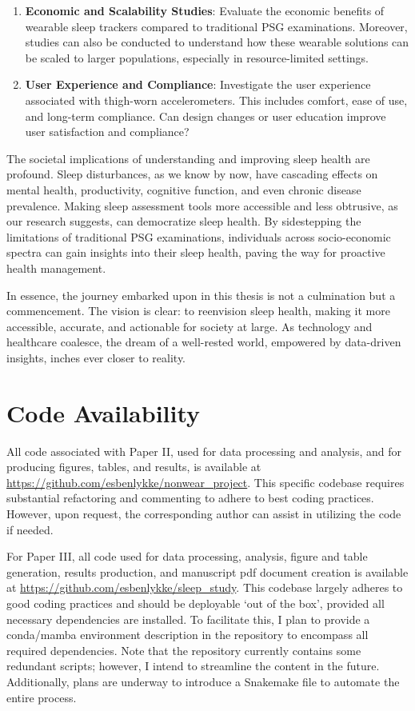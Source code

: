 \documentclass[
  10pt,
]{scrbook}
\let\originaltextbf\textbf
\renewcommand{\textbf}[1]{\textcolor{color1}{\textsf{\originaltextbf{#1}}}}
\begin{document}
\begin{enumerate}
\def\labelenumi{\arabic{enumi}.}
\item
  \textbf{Economic and Scalability Studies}: Evaluate the economic
  benefits of wearable sleep trackers compared to traditional PSG
  examinations. Moreover, studies can also be conducted to understand
  how these wearable solutions can be scaled to larger populations,
  especially in resource-limited settings.
\item
  \textbf{User Experience and Compliance}: Investigate the user
  experience associated with thigh-worn accelerometers. This includes
  comfort, ease of use, and long-term compliance. Can design changes or
  user education improve user satisfaction and compliance?
\end{enumerate}

The societal implications of understanding and improving sleep health
are profound. Sleep disturbances, as we know by now, have cascading
effects on mental health, productivity, cognitive function, and even
chronic disease prevalence. Making sleep assessment tools more
accessible and less obtrusive, as our research suggests, can democratize
sleep health. By sidestepping the limitations of traditional PSG
examinations, individuals across socio-economic spectra can gain
insights into their sleep health, paving the way for proactive health
management.

In essence, the journey embarked upon in this thesis is not a
culmination but a commencement. The vision is clear: to reenvision sleep
health, making it more accessible, accurate, and actionable for society
at large. As technology and healthcare coalesce, the dream of a
well-rested world, empowered by data-driven insights, inches ever closer
to reality.

\hypertarget{code-availability}{%
\chapter{Code Availability}\label{code-availability}}

All code associated with Paper II, used for data processing and
analysis, and for producing figures, tables, and results, is available
at \url{https://github.com/esbenlykke/nonwear_project}. This specific
codebase requires substantial refactoring and commenting to adhere to
best coding practices. However, upon request, the corresponding author
can assist in utilizing the code if needed.

For Paper III, all code used for data processing, analysis, figure and
table generation, results production, and manuscript pdf document
creation is available at
\url{https://github.com/esbenlykke/sleep_study}. This codebase largely
adheres to good coding practices and should be deployable `out of the
box', provided all necessary dependencies are installed. To facilitate
this, I plan to provide a conda/mamba environment description in the
repository to encompass all required dependencies. Note that the
repository currently contains some redundant scripts; however, I intend
to streamline the content in the future. Additionally, plans are
underway to introduce a Snakemake file to automate the entire process.
\end{document}
